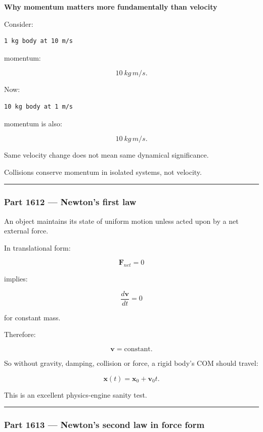 \textbf{Why momentum matters more fundamentally than velocity}

Consider:

\begin{verbatim}
1 kg body at 10 m/s
\end{verbatim}

momentum:

\[
10\ kg\,m/s.
\]

Now:

\begin{verbatim}
10 kg body at 1 m/s
\end{verbatim}

momentum is also:

\[
10\ kg\,m/s.
\]

Same velocity change does not mean same dynamical significance.

Collisions conserve momentum in isolated systems, not velocity.

\begin{center}\rule{0.5\linewidth}{0.5pt}\end{center}

\subsubsection{Part 1612 --- Newton's first law}\label{part-1612-newtons-first-law}

An object maintains its state of uniform motion unless acted upon by a net external force.

In translational form:

\[
\mathbf{F}_{net}=0
\]

implies:

\[
\frac{d\mathbf{v}}{dt}=0
\]

for constant mass.

Therefore:

\[
\mathbf{v}=\text{constant}.
\]

So without gravity, damping, collision or force, a rigid body's COM should travel:

\[
\mathbf{x}(t)
=
\mathbf{x}_0
+
\mathbf{v}_0t.
\]

This is an excellent physics-engine sanity test.

\begin{center}\rule{0.5\linewidth}{0.5pt}\end{center}

\subsubsection{Part 1613 --- Newton's second law in force form}\label{part-1613-newtons-second-law-in-force-form}

